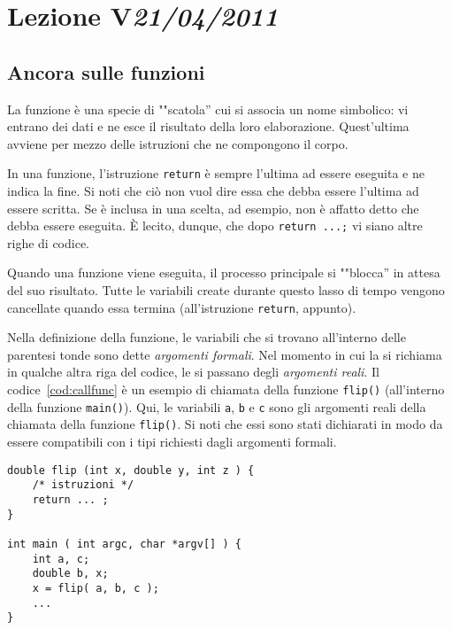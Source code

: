 \chapter[Lezione V]{Lezione V\newline\small{\emph{21/04/2011}}}
	\section{Ancora sulle funzioni}
	\label{sec:fun2}
La funzione è una specie di ""scatola'' cui si associa un nome simbolico: vi entrano dei dati e ne esce il risultato della loro elaborazione. Quest'ultima avviene per mezzo delle istruzioni che ne compongono il corpo.

In  una funzione, l'istruzione \lstinline!return! è sempre l'ultima ad essere eseguita e ne indica la fine. Si noti che ciò non vuol dire essa che debba essere l'ultima ad essere scritta. Se è inclusa in una scelta, ad esempio, non è affatto detto che debba essere eseguita. \`E lecito, dunque, che dopo \lstinline!return ...;! vi siano altre righe di codice.

Quando una funzione viene eseguita, il processo principale si ""blocca'' in attesa del suo risultato. Tutte le variabili create durante questo lasso di tempo vengono cancellate quando essa termina (all'istruzione \lstinline!return!, appunto). 

Nella definizione della funzione, le variabili che si trovano all'interno delle parentesi tonde sono dette \emph{argomenti formali}. Nel momento in cui la si richiama in qualche altra riga del codice, le si passano degli \emph{argomenti reali}. Il codice~\vref{cod:callfunc} è un esempio di chiamata della funzione \lstinline!flip()! (all'interno della funzione \lstinline!main()!). Qui, le variabili \lstinline!a!, \lstinline!b! e \lstinline!c! sono gli argomenti reali della chiamata della funzione \lstinline!flip()!. Si noti che essi sono stati dichiarati in modo da essere compatibili con i tipi richiesti dagli argomenti formali.
\begin{lstlisting}[caption={\em Chiamata della funzione \lstinline!flip()!.}, label={cod:callfunc}]
double flip (int x, double y, int z ) {
	/* istruzioni */
	return ... ;
}

int main ( int argc, char *argv[] ) {
	int a, c;
	double b, x;
	x = flip( a, b, c );
	...
}
\end{lstlisting}

